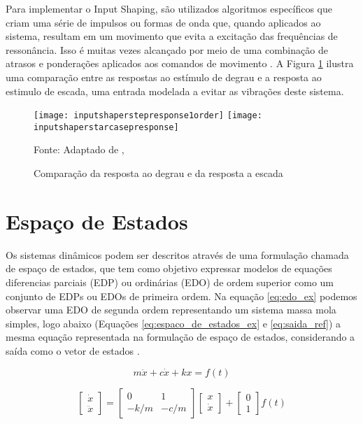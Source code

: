 Para implementar o Input Shaping, são utilizados algoritmos específicos que criam uma série de impulsos ou formas de onda que, quando aplicados ao sistema, resultam em um movimento que evita a excitação das frequências de ressonância. Isso é muitas vezes alcançado por meio de uma combinação de atrasos e ponderações aplicados aos comandos de movimento \cite{singhose97}. A Figura \ref{fig:degr_vs_esc} ilustra uma comparação entre as respostas ao estímulo de degrau e a resposta ao estimulo de escada, uma entrada modelada a evitar as vibrações deste sistema.

\begin{figure}[H]
    \centering
    \caption{Comparação da resposta ao degrau e da resposta a escada}
    \texttt{[image: inputshaperstepresponse1order]}
    \texttt{[image: inputshaperstarcasepresponse]}

    {\footnotesize Fonte: Adaptado de \citeauthor{singhose97}, \citeyear{singhose97}}
    \label{fig:degr_vs_esc}
\end{figure}

\section{Espaço de Estados}

Os sistemas dinâmicos podem ser descritos através de uma formulação chamada de espaço de estados, que tem como objetivo expressar modelos de equações diferencias parciais (EDP) ou ordinárias (EDO) de ordem superior como um conjunto de EDPs ou EDOs de primeira ordem. Na equação \ref{eq:edo_ex} podemos observar uma EDO de segunda ordem representando um sistema massa mola simples, logo abaixo (Equações \ref{eq:espaco_de_estados_ex} e \ref{eq:saida_ref}) a mesma equação representada na formulação de espaço de estados, considerando a saída como o vetor de estados \cite{hamilton94}.

\begin{equation}
    \label{eq:edo_ex}
    m \ddot x+c \dot x+kx = f(t)
\end{equation}

\begin{equation}
    \label{eq:espaco_de_estados_ex}
    \begin{bmatrix}
        \dot x \\
        \ddot x
    \end{bmatrix}
    =
    \begin{bmatrix}
        0 & 1 \\
        -k/m & -c/m
    \end{bmatrix}
    \begin{bmatrix}
        x \\
        \dot x
    \end{bmatrix}
    +
    \begin{bmatrix}
        0 \\
        1
    \end{bmatrix}
    f(t)
\end{equation}

